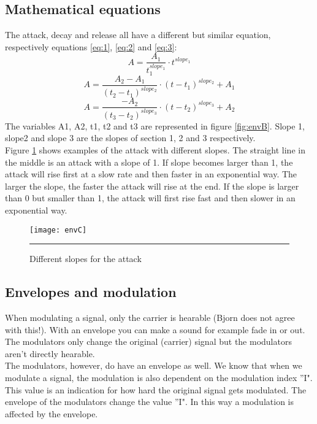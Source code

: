 \subsection{Mathematical equations}
The attack, decay and release all have a different but similar equation, respectively equations \ref{eq:1}, \ref{eq:2} and \ref{eq:3}:
\begin{equation}
A = \frac{A_{1}}{t_{1}^{slope_{1}}} \cdot t^{slope_{1}}
\end{equation}
\begin{equation}
A = \frac{A_{2} - A_{1}}{ (t_{2} - t_{1})^{slope_{2}}} \cdot (t  -t_{1})^{slope_{2}} + A_{1}
\end{equation}
\begin{equation}
A = \frac{- A_{2}}{(t_{3} - t_{2})^{slope_{3}}} \cdot (t - t_{2})^{slope_{3}} + A_{2}
\end{equation}
The variables A1, A2, t1, t2 and t3 are represented in figure \ref{fig:envB}. Slope 1, slope2 and slope 3 are the slopes of section 1, 2 and 3 respectively. \\
Figure \ref{fig:slopes} shows examples of the attack with different slopes. The straight line in the middle is an attack with a slope of 1. If slope becomes larger than 1, the attack will rise first at a slow rate and then faster in an exponential way. The larger the slope, the faster the attack will rise at the end. If the slope is larger than 0 but smaller than 1, the attack will first rise fast and then slower in an exponential way.
\begin{figure}[htbp]
\centering
\texttt{[image: envC]}
\rule{30em}{0.5pt}
\caption{Different slopes for the attack}
\label{fig:slopes}
\end{figure}
\subsection{Envelopes and modulation}
When modulating a signal, only the carrier is hearable (Bjorn does not agree with this!). With an envelope you can make a sound for example fade in or out. The modulators only change the original (carrier) signal but the modulators aren't directly hearable.\\  
The modulators, however, do have an envelope as well. We know that when we modulate a signal, the modulation is also dependent on the modulation index ''I". This value is an indication for how hard the original signal gets modulated. The envelope of the modulators change the value ''I". In this way a modulation is affected by the envelope.
